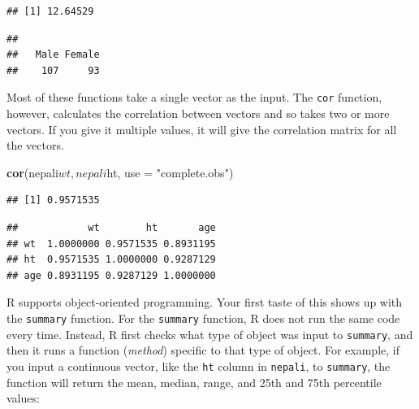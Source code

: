 \documentclass[]{book}
\makeatletter
\newenvironment{Shaded}{\begin{snugshade}}{\end{snugshade}}
\newcommand{\KeywordTok}[1]{\textcolor[rgb]{0.13,0.29,0.53}{\textbf{{#1}}}}
\newcommand{\DataTypeTok}[1]{\textcolor[rgb]{0.13,0.29,0.53}{{#1}}}
\newcommand{\StringTok}[1]{\textcolor[rgb]{0.31,0.60,0.02}{{#1}}}
\newcommand{\NormalTok}[1]{{#1}}
\newenvironment{kframe}{%
\medskip{}
\setlength{\fboxsep}{.8em}
 \def\at@end@of@kframe{}%
 \ifinner\ifhmode%
  \def\at@end@of@kframe{\end{minipage}}%
  \begin{minipage}{\columnwidth}%
 \fi\fi%
 \def\FrameCommand##1{\hskip\@totalleftmargin \hskip-\fboxsep
 \colorbox{shadecolor}{##1}\hskip-\fboxsep
     \hskip-\linewidth \hskip-\@totalleftmargin \hskip\columnwidth}%
 \MakeFramed {\advance\hsize-\width
   \@totalleftmargin\z@ \linewidth\hsize
   \@setminipage}}%
 {\par\unskip\endMakeFramed%
 \at@end@of@kframe}
\renewenvironment{Shaded}{\begin{kframe}}{\end{kframe}}
\makeatother
\begin{document}
\begin{verbatim}
## [1] 12.64529
\end{verbatim}

\begin{Shaded}
\end{Shaded}

\begin{verbatim}
## 
##   Male Female 
##    107     93
\end{verbatim}

Most of these functions take a single vector as the input. The
\texttt{cor} function, however, calculates the correlation between
vectors and so takes two or more vectors. If you give it multiple
values, it will give the correlation matrix for all the vectors.

\begin{Shaded}
\begin{Highlighting}[]
\KeywordTok{cor}\NormalTok{(nepali$wt, nepali$ht, }\DataTypeTok{use =} \StringTok{"complete.obs"}\NormalTok{)}
\end{Highlighting}
\end{Shaded}

\begin{verbatim}
## [1] 0.9571535
\end{verbatim}

\begin{Shaded}
\end{Shaded}

\begin{verbatim}
##            wt        ht       age
## wt  1.0000000 0.9571535 0.8931195
## ht  0.9571535 1.0000000 0.9287129
## age 0.8931195 0.9287129 1.0000000
\end{verbatim}

R supports object-oriented programming. Your first taste of this shows
up with the \texttt{summary} function. For the \texttt{summary}
function, R does not run the same code every time. Instead, R first
checks what type of object was input to \texttt{summary}, and then it
runs a function (\emph{method}) specific to that type of object. For
example, if you input a continuous vector, like the \texttt{ht} column
in \texttt{nepali}, to \texttt{summary}, the function will return the
mean, median, range, and 25th and 75th percentile values:
\end{document}
